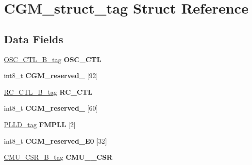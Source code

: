 \hypertarget{structCGM__struct__tag}{}\section{C\+G\+M\+\_\+struct\+\_\+tag Struct Reference}
\label{structCGM__struct__tag}
\subsection*{Data Fields}
\begin{DoxyCompactItemize}
\item 
\mbox{\label{structCGM__struct__tag_aaa885d3d87b0db4e5c42eaae330de76c}} 
\mbox{\hyperlink{unionOSC__CTL__32B__tag}{O\+S\+C\+\_\+\+C\+T\+L\+\_\+B\+\_\+tag}} {\bfseries O\+S\+C\+\_\+\+C\+TL}
\item 
\mbox{\label{structCGM__struct__tag_a58888bcb75f97fa46b202e01e7510422}} 
int8\+\_\+t {\bfseries C\+G\+M\+\_\+reserved\+\_} \mbox{[}92\mbox{]}
\item 
\mbox{\label{structCGM__struct__tag_a25a9391d7bbea613a654c75e6bee49e5}} 
\mbox{\hyperlink{unionRC__CTL__32B__tag}{R\+C\+\_\+\+C\+T\+L\+\_\+B\+\_\+tag}} {\bfseries R\+C\+\_\+\+C\+TL}
\item 
\mbox{\label{structCGM__struct__tag_a5abf6f67963d46d5081ed1ba627f379e}} 
int8\+\_\+t {\bfseries C\+G\+M\+\_\+reserved\+\_} \mbox{[}60\mbox{]}
\item 
\mbox{\label{structCGM__struct__tag_ada7116dd8cb17c593eabd8bd02a92a67}} 
\mbox{\hyperlink{structPLLD__struct__tag}{P\+L\+L\+D\+\_\+tag}} {\bfseries F\+M\+P\+LL} \mbox{[}2\mbox{]}
\item 
\mbox{\label{structCGM__struct__tag_a88e9bcaa4526352a037dd403e6e27b95}} 
int8\+\_\+t {\bfseries C\+G\+M\+\_\+reserved\+\_\+E0} \mbox{[}32\mbox{]}
\item 
\mbox{\label{structCGM__struct__tag_a3ffb06578874df213cfa466cb7bb0a51}} 
\mbox{\hyperlink{unionCMU__CSR__32B__tag}{C\+M\+U\+\_\+\+C\+S\+R\+\_\+B\+\_\+tag}} {\bfseries C\+M\+U\+\_\+\_\+\+C\+SR}

\end{DoxyCompactItemize}
